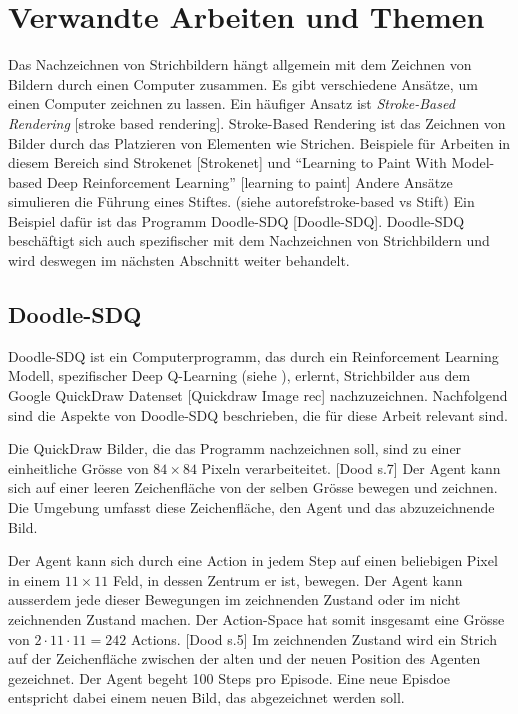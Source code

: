 \section{Verwandte Arbeiten und Themen}
\label{chap:t_ver}
Das Nachzeichnen von Strichbildern hängt allgemein mit dem Zeichnen von Bildern
durch einen Computer zusammen. Es gibt verschiedene Ansätze, um einen Computer
zeichnen zu lassen. Ein häufiger Ansatz ist \emph{Stroke-Based Rendering}
[stroke based rendering]. Stroke-Based Rendering ist das Zeichnen von Bilder
durch das Platzieren von Elementen wie Strichen. Beispiele für Arbeiten in
diesem Bereich sind Strokenet [Strokenet] und ``Learning to Paint With
Model-based Deep Reinforcement Learning'' [learning to paint] Andere Ansätze
simulieren die Führung eines Stiftes. (siehe autoref{stroke-based vs Stift}) Ein
Beispiel dafür ist das Programm Doodle-SDQ [Doodle-SDQ]. Doodle-SDQ beschäftigt
sich auch spezifischer mit dem Nachzeichnen von Strichbildern und wird deswegen
im nächsten Abschnitt weiter behandelt.


\subsection{Doodle-SDQ}
\label{sub:t_ver_dood}
Doodle-SDQ ist ein Computerprogramm, das durch ein Reinforcement Learning
Modell, spezifischer Deep Q-Learning (siehe ), erlernt,
Strichbilder aus dem Google QuickDraw Datenset [Quickdraw Image rec]
nachzuzeichnen. Nachfolgend sind die Aspekte von Doodle-SDQ beschrieben, die für
diese Arbeit relevant sind.

Die QuickDraw Bilder, die das Programm nachzeichnen soll, sind zu einer
einheitliche Grösse von $84\times84$ Pixeln verarbeiteitet. [Dood s.7] Der Agent
kann sich auf einer leeren Zeichenfläche von der selben Grösse bewegen und
zeichnen. Die Umgebung umfasst diese Zeichenfläche, den Agent und das
abzuzeichnende Bild.

Der Agent kann sich durch eine Action in jedem Step auf einen beliebigen Pixel
in einem $11\times11$ Feld, in dessen Zentrum er ist, bewegen. Der Agent kann
ausserdem jede dieser Bewegungen im zeichnenden Zustand oder im nicht
zeichnenden Zustand machen. Der Action-Space hat somit insgesamt eine Grösse von
$2\cdot11\cdot11 = 242$ Actions. [Dood s.5] Im zeichnenden Zustand wird ein Strich auf der
Zeichenfläche zwischen der alten und der neuen Position des Agenten gezeichnet.
Der Agent begeht 100 Steps pro Episode. Eine neue Episdoe entspricht dabei einem
neuen Bild, das abgezeichnet werden soll.


